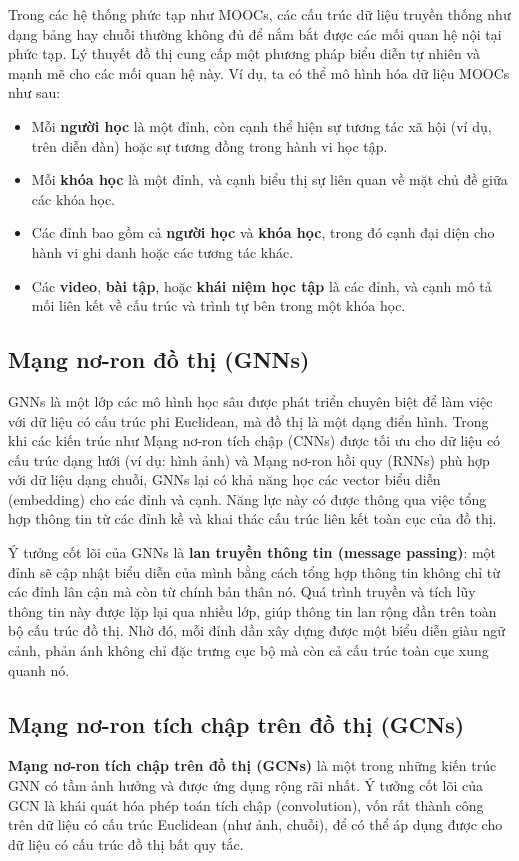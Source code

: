 Trong các hệ thống phức tạp như MOOCs, các cấu trúc dữ liệu truyền thống như dạng bảng hay chuỗi thường không đủ để nắm bắt được các mối quan hệ nội tại phức tạp. Lý thuyết đồ thị cung cấp một phương pháp biểu diễn tự nhiên và mạnh mẽ cho các mối quan hệ này. Ví dụ, ta có thể mô hình hóa dữ liệu MOOCs như sau:
\begin{itemize}
    \item Mỗi \textbf{người học} là một đỉnh, còn cạnh thể hiện sự tương tác xã hội (ví dụ, trên diễn đàn) hoặc sự tương đồng trong hành vi học tập.
    \item Mỗi \textbf{khóa học} là một đỉnh, và cạnh biểu thị sự liên quan về mặt chủ đề giữa các khóa học.
    \item Các đỉnh bao gồm cả \textbf{người học} và \textbf{khóa học}, trong đó cạnh đại diện cho hành vi ghi danh hoặc các tương tác khác.
    \item Các \textbf{video}, \textbf{bài tập}, hoặc \textbf{khái niệm học tập} là các đỉnh, và cạnh mô tả mối liên kết về cấu trúc và trình tự bên trong một khóa học.
\end{itemize}


\subsection{Mạng nơ-ron đồ thị (GNNs)}
GNNs là một lớp các mô hình học sâu được phát triển chuyên biệt để làm việc với dữ liệu có cấu trúc phi Euclidean, mà đồ thị là một dạng điển hình. Trong khi các kiến trúc như Mạng nơ-ron tích chập (CNNs) được tối ưu cho dữ liệu có cấu trúc dạng lưới (ví dụ: hình ảnh) và Mạng nơ-ron hồi quy (RNNs) phù hợp với dữ liệu dạng chuỗi, GNNs lại có khả năng học các vector biểu diễn (embedding) cho các đỉnh và cạnh. Năng lực này có được thông qua việc tổng hợp thông tin từ các đỉnh kề và khai thác cấu trúc liên kết toàn cục của đồ thị.

Ý tưởng cốt lõi của GNNs là \textbf{lan truyền thông tin (message passing)}: một đỉnh sẽ cập nhật biểu diễn của mình bằng cách tổng hợp thông tin không chỉ từ các đỉnh lân cận mà còn từ chính bản thân nó. Quá trình truyền và tích lũy thông tin này được lặp lại qua nhiều lớp, giúp thông tin lan rộng dần trên toàn bộ cấu trúc đồ thị. Nhờ đó, mỗi đỉnh dần xây dựng được một biểu diễn giàu ngữ cảnh, phản ánh không chỉ đặc trưng cục bộ mà còn cả cấu trúc toàn cục xung quanh nó.

\subsection{Mạng nơ-ron tích chập trên đồ thị (GCNs)}
\textbf{Mạng nơ-ron tích chập trên đồ thị (GCNs)} là một trong những kiến trúc GNN có tầm ảnh hưởng và được ứng dụng rộng rãi nhất. Ý tưởng cốt lõi của GCN là khái quát hóa phép toán tích chập (convolution), vốn rất thành công trên dữ liệu có cấu trúc Euclidean (như ảnh, chuỗi), để có thể áp dụng được cho dữ liệu có cấu trúc đồ thị bất quy tắc.

